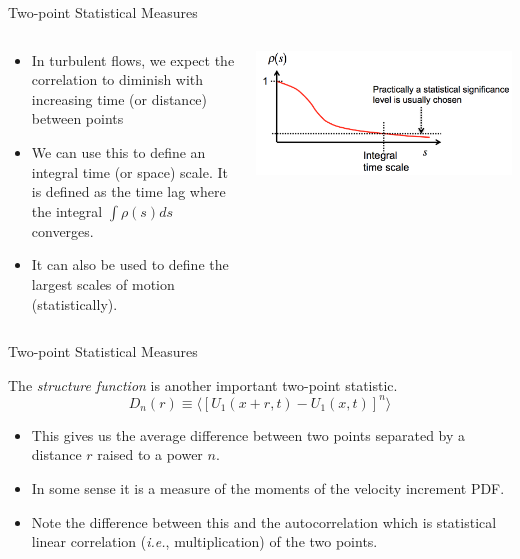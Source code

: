 \begin{frame}{Two-point Statistical Measures}
  
\setlength{\fboxsep}{0pt}
\setlength{\fboxrule}{1pt}
\begin{columns}[T]
    \begin{column}{.45\textwidth}
    \begin{itemize}
    	\item In turbulent flows, we expect the correlation to diminish with increasing time (or
distance) between points
    	\item We can use this to define an integral time (or space) scale. It is defined as the time lag where the integral $\int \rho(s)ds$ converges. 
    	\item It can also be used to define the largest scales of motion (statistically).
    \end{itemize}
    \end{column}
    \begin{column}{.55\textwidth}
    \begin{minipage}[c][.6\textheight][c]{\linewidth}
      \includegraphics[width=\textwidth]{auto1.png}
      \end{minipage}
    \end{column}
  \end{columns}
  
\end{frame}


\begin{frame}{Two-point Statistical Measures}
  
  The \textit{structure function} is another important two-point statistic.
  $$D_n(r) \equiv \langle [U_1(x+r,t) - U_1(x,t)]^n\rangle$$
  \begin{itemize}
  	\item This gives us the average difference between two points separated by a distance $r$ raised to a power $n$.
  	\item In some sense it is a measure of the moments of the velocity increment PDF.
  	\item Note the difference between this and the autocorrelation which is statistical linear correlation (\textit{i.e.}, multiplication) of the two points.
  \end{itemize}
  
\end{frame}




